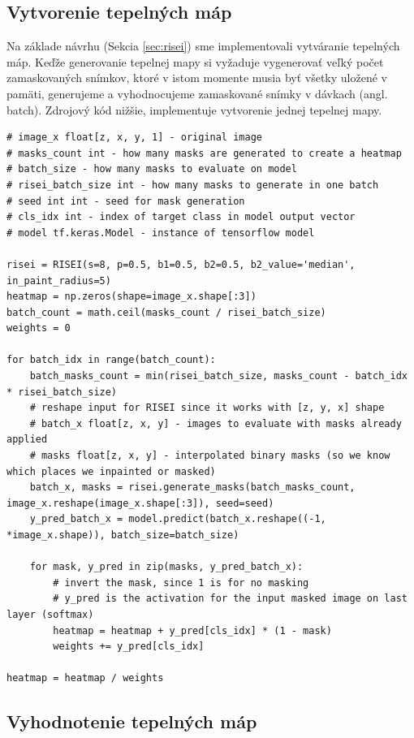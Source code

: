 \subsection{Vytvorenie tepelných máp}

Na základe návrhu (Sekcia \ref{sec:risei}) sme implementovali vytváranie tepelných máp. Keďže generovanie tepelnej mapy si vyžaduje vygenerovať veľký počet zamaskovaných snímkov, ktoré v istom momente musia byť všetky uložené v pamäti, generujeme a vyhodnocujeme zamaskované snímky v dávkach (angl. batch). Zdrojový kód nižšie, implementuje vytvorenie jednej tepelnej mapy.

\begin{lstlisting}
# image_x float[z, x, y, 1] - original image
# masks_count int - how many masks are generated to create a heatmap
# batch_size - how many masks to evaluate on model
# risei_batch_size int - how many masks to generate in one batch
# seed int int - seed for mask generation
# cls_idx int - index of target class in model output vector
# model tf.keras.Model - instance of tensorflow model

risei = RISEI(s=8, p=0.5, b1=0.5, b2=0.5, b2_value='median', in_paint_radius=5)
heatmap = np.zeros(shape=image_x.shape[:3])
batch_count = math.ceil(masks_count / risei_batch_size)
weights = 0

for batch_idx in range(batch_count):
    batch_masks_count = min(risei_batch_size, masks_count - batch_idx * risei_batch_size)
    # reshape input for RISEI since it works with [z, y, x] shape
    # batch_x float[z, x, y] - images to evaluate with masks already applied
    # masks float[z, x, y] - interpolated binary masks (so we know which places we inpainted or masked)
    batch_x, masks = risei.generate_masks(batch_masks_count, image_x.reshape(image_x.shape[:3]), seed=seed)
    y_pred_batch_x = model.predict(batch_x.reshape((-1, *image_x.shape)), batch_size=batch_size)

    for mask, y_pred in zip(masks, y_pred_batch_x):
        # invert the mask, since 1 is for no masking
        # y_pred is the activation for the input masked image on last layer (softmax)
        heatmap = heatmap + y_pred[cls_idx] * (1 - mask)
        weights += y_pred[cls_idx]

heatmap = heatmap / weights
\end{lstlisting}

\subsection{Vyhodnotenie tepelných máp}

